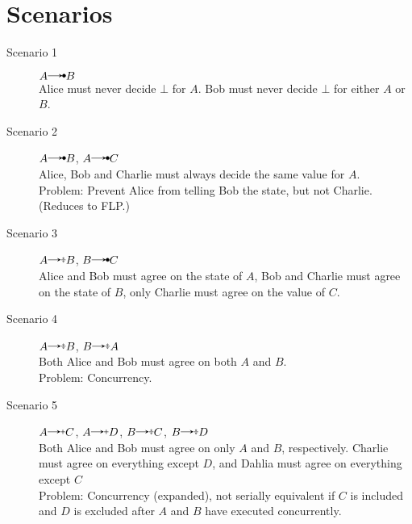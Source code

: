 \documentclass{article}
\begin{document}
	\section*{Scenarios}
	\begin{description}
		\item[Scenario 1] 
			$A\crel B$\\
			Alice must never decide $\bot$ for $A$. Bob must never decide $\bot$ for either $A$ or $B$.
		\item[Scenario 2]
			$A\crel B$, $A\crel C$\\
			Alice, Bob and Charlie must always decide the same value for $A$.\\
			Problem: Prevent Alice from telling Bob the state, but not Charlie. (Reduces to FLP.)
		\item[Scenario 3]
			$A\erel B$, $B\crel C$\\
			Alice and Bob must agree on the state of $A$, Bob and Charlie must agree on the state of $B$, only Charlie must agree on the value of $C$.
		\item[Scenario 4]
			$A\erel B$, $B\erel A$\\
			Both Alice and Bob must agree on both $A$ and $B$.\\
			Problem: Concurrency.
		\item[Scenario 5]
			$A\irel C$, $A\irel D$, $B\erel C$, $B\erel D$\\
			Both Alice and Bob must agree on only $A$ and $B$, respectively. Charlie must agree on everything except $D$, and Dahlia must agree on everything except $C$\\
			Problem: Concurrency (expanded), not serially equivalent if $C$ is included and $D$ is excluded after $A$ and $B$ have executed concurrently.
			
	\end{description}
\end{document}
